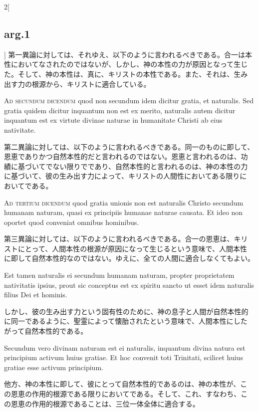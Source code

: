 \documentclass[paper=a4paper,fontsize=10pt,jafontsize=9pt,titlepage]{jlreq}
\begin{document}
\begin{paracol}{2}[\subsection{arg.1}]
第一異論に対しては、それゆえ、以下のように言われるべきである。合一は本
性においてなされたのではないが、しかし、神の本性の力が原因となって生じ
た。そして、神の本性は、真に、キリストの本性である。また、それは、生み
出す力の根源から、キリストに適合している。

\switchcolumn*[\subsection{ad.2}]

{\scshape Ad secundum dicendum} quod non secundum idem dicitur gratia,
et naturalis. Sed gratia quidem dicitur inquantum non est ex merito,
naturalis autem dicitur inquantum est ex virtute divinae naturae in
humanitate Christi ab eius nativitate.

\switchcolumn

第二異論に対しては、以下のように言われるべきである。同一のものに即して、
恩恵でありかつ自然本性的だと言われるのではない。恩恵と言われるのは、功
績に基づいてでない限りでであり、自然本性的と言われるのは、神の本性の力
に基づいて、彼の生み出す力によって、キリストの人間性においてある限りに
おいてである。

\switchcolumn*[\subsection{ad.3}]

{\scshape Ad tertium dicendum} quod gratia unionis non est naturalis
Christo secundum humanam naturam, quasi ex principiis humanae naturae
causata. Et ideo non oportet quod conveniat omnibus hominibus.

\switchcolumn

第三異論に対しては、以下のように言われるべきである。合一の恩恵は、キリ
ストにとって、人間本性の根源が原因になって生じるという意味で、人間本性
に即して自然本性的なのではない。ゆえに、全ての人間に適合しなくてもよい。

\switchcolumn*

Est tamen naturalis ei secundum humanam naturam, propter proprietatem
nativitatis ipsius, prout sic conceptus est ex spiritu sancto ut esset
idem naturalis filius Dei et hominis.

\switchcolumn

しかし、彼の生み出す力という固有性のために、神の息子と人間が自然本性的
に同一であるように、聖霊によって懐胎されたという意味で、人間本性にした
がって自然本性的である。

\switchcolumn*

Secundum vero divinam naturam est ei naturalis, inquantum divina
natura est principium activum huius gratiae. Et hoc convenit toti
Trinitati, scilicet huius gratiae esse activum principium.

\switchcolumn

他方、神の本性に即して、彼にとって自然本性的であるのは、神の本性が、こ
の恩恵の作用的根源である限りにおいてである。そして、これ、すなわち、こ
の恩恵の作用的根源であることは、三位一体全体に適合する。

\end{paracol}
\end{document}
